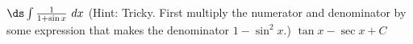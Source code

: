 {$\ds \int \frac{1}{1+\sin x}\ dx$ (Hint: Tricky.  First multiply the numerator and denominator by some expression that makes the denominator $1-\sin^2 x$.)}
{$\tan x - \sec x+ C$}

